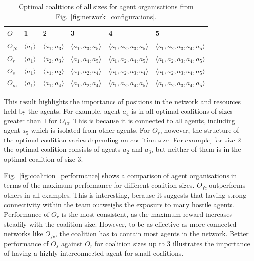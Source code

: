 \documentclass{llncs}
\newcommand{\LD}{\langle}
\newcommand{\RD}{\rangle}
\begin{document}
\begin{table}[hb]
 \centering
 \begin{tabular}{ | l | l | l | l | l | l |}
    \hline
    $O$ & 1& 2 & 3 & 4 & 5 \\ \hline
    $O_{\mathit{fc}}$ & $\LD a_1 \RD$ & $\LD a_1, a_3 \RD$ & $\LD a_1, a_3, a_5 \RD$ & $\LD a_1, a_2, a_3, a_5 \RD$  & $\LD a_1, a_2, a_3, a_4, a_5 \RD$ \\ \hline
    $O_r$ & $\LD a_1 \RD$  & $\LD a_2, a_3 \RD$ & $\LD a_1, a_4, a_5 \RD$ & $\LD a_1, a_2, a_4, a_5 \RD$  & $\LD a_1, a_2, a_3, a_4, a_5 \RD$ \\ \hline
    $O_s$ & $\LD a_1 \RD$  & $\LD a_1, a_2 \RD$ & $\LD a_1, a_2, a_4 \RD$ & $\LD a_1, a_2, a_3, a_4 \RD$  & $\LD a_1, a_2, a_3, a_4, a_5 \RD$ \\ \hline
    $O_{ia}$ & $\LD a_1 \RD$  & $\LD a_1, a_4 \RD$ & $\LD a_1, a_2, a_4 \RD$ & $\LD a_1, a_2, a_4, a_5 \RD$  & $\LD a_1, a_2, a_3, a_4, a_5 \RD$ \\ \hline
\end{tabular}
\vspace{+4pt}
\caption{Optimal coalitions of all sizes for agent organisations from Fig.~\ref{fig:network_configurations}.}
\label{tab:optimal_coalitions}
\end{table}
This result highlights the importance of positions in the network and resources held by the agents.
For example, agent $a_4$ is in all optimal coalitions of sizes greater than 1 for $O_{ia}$.
This is because it is connected to all agents, including agent $a_5$ which is isolated from other agents.
For $O_r$, however, the structure of the optimal coalition varies depending on coalition size. For example, for size 2 the optimal coalition consists of agents $a_2$ and $a_3$, but neither of them is in the optimal coalition of size 3.

Fig.~\ref{fig:coalition_performance} shows a comparison of agent organisations in terms of the maximum performance for different coalition sizes. $O_{\mathit{fc}}$ outperforms others in all examples. This is interesting, because it suggests that having strong connectivity within the team outweighs the exposure to many hostile agents. Performance of $O_r$ is the most consistent, as the maximum reward increases steadily with the coalition size.
However, to be as effective as more connected networks like $O_{\mathit{fc}}$, the coalition has to contain most agents in the network. Better performance of $O_s$ against $O_r$ for coalition sizes up to 3 illustrates the importance of having a highly interconnected agent for small coalitions.
\end{document}
